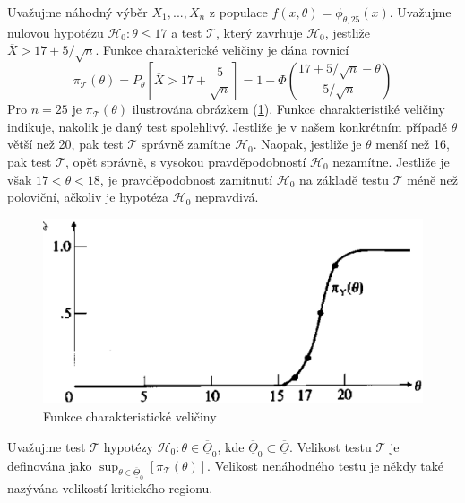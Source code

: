 \begin{example}
Uvažujme náhodný výběr $X_1, ..., X_n$ z populace $f(x, \theta) = \phi_{\theta, 25}(x)$. Uvažujme nulovou hypotézu $\mathscr{H}_0: \theta \le 17$ a test $\mathscr{T}$, který zavrhuje $\mathscr{H}_0$, jestliže $\overline{X} > 17 + 5 / \sqrt{n}$. Funkce charakterické veličiny je dána rovnicí
\begin{equation*}
\pi_{\mathscr{T}}(\theta) = P_{\theta}\left[\overline{X} > 17 + \frac{5}{\sqrt{n}} \right] = 1 - \Phi\left(\frac{17 + 5 / \sqrt{n} - \theta}{5 / \sqrt{n}}\right)
\end{equation*}
Pro $n = 25$ je $\pi_{\mathscr{T}}(\theta)$ ilustrována obrázkem (\ref{power-function}). Funkce charakteristiké veličiny indikuje, nakolik je daný test spolehlivý. Jestliže je v našem konkrétním případě $\theta$ větší než 20, pak test $\mathscr{T}$ správně zamítne $\mathscr{H}_0$. Naopak, jestliže je $\theta$ menší než 16, pak test $\mathscr{T}$, opět správně, s vysokou pravděpodobností $\mathscr{H}_0$ nezamítne. Jestliže je však $17 < \theta < 18$, je pravděpodobnost zamítnutí $\mathscr{H}_0$ na základě testu $\mathscr{T}$ méně než poloviční, ačkoliv je hypotéza $\mathscr{H}_0$ nepravdivá.
\end{example}

\begin{figure}[htp]
\centering
\includegraphics[scale = 0.5]{pictures/power_function.eps}
\caption{Funkce charakteristické veličiny}
\label{power-function}
\end{figure}

\begin{definition}
Uvažujme test $\mathscr{T}$ hypotézy $\mathscr{H}_0: \theta \in \overline{\underline{\Theta}}_0$, kde $\overline{\underline{\Theta}}_0 \subset \overline{\underline{\Theta}}$. Velikost testu $\mathscr{T}$ je definována jako $\sup_{\theta \in \overline{\underline{\Theta}}_0}[\pi_{\mathscr{T}}(\theta)]$. Velikost nenáhodného testu je někdy také nazývána velikostí kritického regionu.
\end{definition}

